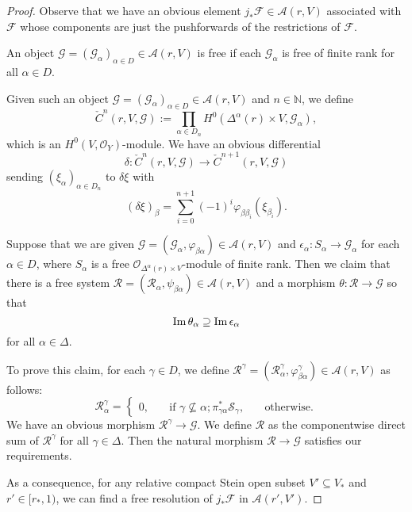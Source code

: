 \begin{proof}
    Observe that we have an obvious element $j_*\mathcal{F}\in \mathcal{A}(r,V)$ associated with $\mathcal{F}$ whose components are just the pushforwards of the restrictions of $\mathcal{F}$.
    
    An object $\mathcal{G}=(\mathcal{G}_{\alpha})_{\alpha\in D}\in \mathcal{A}(r,V)$ is free if each $\mathcal{G}_{\alpha}$ is free of finite rank for all $\alpha\in D$.

    Given such an object $\mathcal{G}=(\mathcal{G}_{\alpha})_{\alpha\in D}\in \mathcal{A}(r,V)$ and $n\in \mathbb{N}$, we define
    \[
        \check{C}^n(r,V,\mathcal{G}):=\prod_{\alpha\in D_n} H^0(\Delta^{\alpha}(r)\times V,\mathcal{G}_{\alpha}), 
    \]
    which is an $H^0(V,\mathcal{O}_Y)$-module. We have an obvious differential 
    \[
        \delta:  \check{C}^n(r,V,\mathcal{G})\rightarrow \check{C}^{n+1}(r,V,\mathcal{G})
    \]
    sending $(\xi_{\alpha})_{\alpha\in D_n}$ to $\delta\xi$ with
    \[
        (\delta\xi)_{\beta}=\sum_{i=0}^{n+1}(-1)^i \varphi_{\beta\beta_i}(\xi_{\beta_i}).  
    \]

    Suppose that we are given $\mathcal{G}=(\mathcal{G}_{\alpha},\varphi_{\beta\alpha})\in \mathcal{A}(r,V)$ and $\epsilon_{\alpha}:S_{\alpha}\rightarrow \mathcal{G}_{\alpha}$ for each $\alpha\in D$, where $S_{\alpha}$ is a free $\mathcal{O}_{\Delta^{\alpha}(r)\times V}$-module of finite rank. Then we claim that there is a free system $\mathcal{R}=(\mathcal{R}_{\alpha},\psi_{\beta\alpha})\in \mathcal{A}(r,V)$ and a morphism $\theta:\mathcal{R}\rightarrow \mathcal{G}$ so that
    \[
        \operatorname{Im} \theta_{\alpha}\supseteq \operatorname{Im} \epsilon_{\alpha}  
    \]
    for all $\alpha\in \Delta$.

    To prove this claim, for each $\gamma\in D$, we define $\mathcal{R}^{\gamma}=(\mathcal{R}^{\gamma}_{\alpha},\varphi_{\beta\alpha}^{\gamma})\in \mathcal{A}(r,V)$ as follows:
    \[
        \mathcal{R}^{\gamma}_{\alpha}=\left\{
            \begin{aligned}
                0, & \quad \text{if }\gamma\not\subseteq \alpha;
                \pi_{\gamma\alpha}^*\mathcal{S}_{\gamma},& \quad \text{otherwise}.
            \end{aligned}
        \right.
    \]
    We have an obvious morphism $\mathcal{R}^{\gamma}\rightarrow \mathcal{G}$. We define $\mathcal{R}$ as the componentwise direct sum of $\mathcal{R}^{\gamma}$ for all $\gamma\in \Delta$. Then the natural morphism $\mathcal{R}\rightarrow \mathcal{G}$ satisfies our requirements.

    As a consequence, for any relative compact Stein open subset $V'\subseteq V_*$ and $r'\in [r_*,1)$, we can find a free resolution of $j_*\mathcal{F}$ in $\mathcal{A}(r',V')$.


\end{proof}

